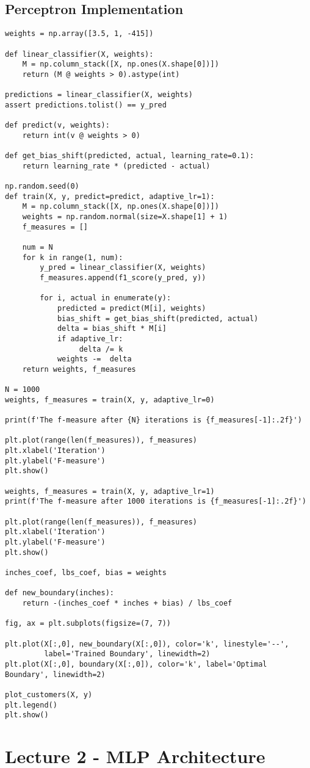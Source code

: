 \documentclass[article]{llncs}
\begin{document}
\subsection{Perceptron Implementation}
\begin{verbatim}
weights = np.array([3.5, 1, -415])

def linear_classifier(X, weights):
    M = np.column_stack([X, np.ones(X.shape[0])])
    return (M @ weights > 0).astype(int)

predictions = linear_classifier(X, weights)
assert predictions.tolist() == y_pred

def predict(v, weights): 
    return int(v @ weights > 0)

def get_bias_shift(predicted, actual, learning_rate=0.1): 
    return learning_rate * (predicted - actual)

np.random.seed(0)
def train(X, y, predict=predict, adaptive_lr=1):
    M = np.column_stack([X, np.ones(X.shape[0])])
    weights = np.random.normal(size=X.shape[1] + 1)
    f_measures = []
    
    num = N
    for k in range(1, num):
        y_pred = linear_classifier(X, weights)
        f_measures.append(f1_score(y_pred, y))
        
        for i, actual in enumerate(y):
            predicted = predict(M[i], weights)
            bias_shift = get_bias_shift(predicted, actual)
            delta = bias_shift * M[i]
            if adaptive_lr:
                 delta /= k
            weights -=  delta 
    return weights, f_measures

N = 1000
weights, f_measures = train(X, y, adaptive_lr=0)

print(f'The f-measure after {N} iterations is {f_measures[-1]:.2f}')

plt.plot(range(len(f_measures)), f_measures)
plt.xlabel('Iteration')
plt.ylabel('F-measure')
plt.show()

weights, f_measures = train(X, y, adaptive_lr=1)
print(f'The f-measure after 1000 iterations is {f_measures[-1]:.2f}') 

plt.plot(range(len(f_measures)), f_measures)
plt.xlabel('Iteration')
plt.ylabel('F-measure')
plt.show()

inches_coef, lbs_coef, bias = weights

def new_boundary(inches):
    return -(inches_coef * inches + bias) / lbs_coef

fig, ax = plt.subplots(figsize=(7, 7))

plt.plot(X[:,0], new_boundary(X[:,0]), color='k', linestyle='--',
         label='Trained Boundary', linewidth=2)
plt.plot(X[:,0], boundary(X[:,0]), color='k', label='Optimal Boundary', linewidth=2)

plot_customers(X, y)
plt.legend()
plt.show()
\end{verbatim}

\section{Lecture 2 - MLP Architecture}

\end{document}
